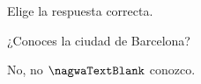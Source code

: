 
\begin{question}

\begin{instance}
  
\begin{mcq}[standalone=false]
    
\begin{stem}
      Elige la respuesta correcta.\par      
\begin{enumerationnolabel}
        \item{          ¿Conoces la ciudad de Barcelona?        }        \item{          No, no $\nagwaTextBlank$ conozco.        }      
\end{enumerationnolabel}
    
\end{stem}
    
\begin{distractors}
\end{distractors}
              
\end{mcq}

\end{instance}

\end{question}
